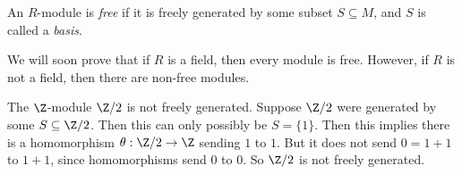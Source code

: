 \documentclass[a4paper]{article}
\begin{document}
\begin{defi}
  An $R$-module is \emph{free} if it is freely generated by some subset $S \subseteq M$, and $S$ is called a \emph{basis}.
\end{defi}
We will soon prove that if $R$ is a field, then every module is free. However, if $R$ is not a field, then there are non-free modules.
\begin{eg}
  The $\Z$-module $\Z/2$ is not freely generated. Suppose $\Z/2$ were generated by some $S \subseteq \Z/2$. Then this can only possibly be $S = \{1\}$. Then this implies there is a homomorphism $\theta: \Z/2 \to \Z$ sending $1$ to $1$. But it does not send $0 = 1 + 1$ to $1 + 1$, since homomorphisms send $0$ to $0$. So $\Z/2$ is not freely generated.
\end{eg}
\end{document}
